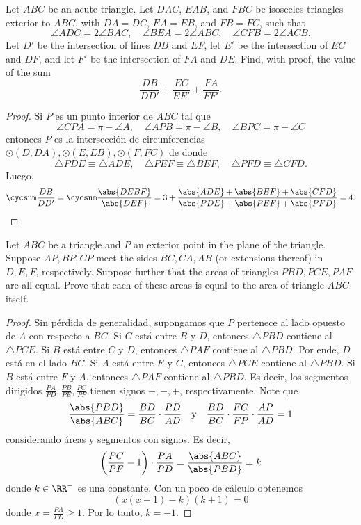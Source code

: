 \begin{probEG}[ISL 2001/G5]
  Let $ABC$ be an acute triangle. Let $DAC$, $EAB$, and $FBC$ be isosceles
  triangles exterior to $ABC$, with $DA=DC$, $EA=EB$, and $FB=FC$, such that
  \[
    \angle ADC=2\angle BAC,\quad
    \angle BEA=2\angle ABC,\quad
    \angle CFB=2\angle ACB.
  \]
  Let $D'$ be the intersection of lines $DB$ and $EF$, let $E'$ be the
  intersection of $EC$ and $DF$, and let $F'$ be the intersection of $FA$ and
  $DE$. Find, with proof, the value of the sum
  \[\frac{DB}{DD'}+\frac{EC}{EE'}+\frac{FA}{FF'}.\]
\end{probEG}

\begin{proof}
  Si $P$ es un punto interior de $ABC$ tal que
  \[
    \angle CPA=\pi-\angle A,\quad
    \angle APB=\pi-\angle B,\quad
    \angle BPC=\pi-\angle C
  \]
  entonces $P$ es la intersección de circunferencias
  $\odot(D,DA),\odot(E,EB),\odot(F,FC)$ de donde
  \[
    \triangle PDE\equiv\triangle ADE,\quad
    \triangle PEF\equiv\triangle BEF,\quad
    \triangle PFD\equiv\triangle CFD.
  \]
  Luego,
  \[
    \cycsum\frac{DB}{DD'}
    =\cycsum\frac{\abs{DEBF}}{\abs{DEF}}
    =3+\frac{\abs{ADE}+\abs{BEF}+\abs{CFD}}{\abs{PDE}+\abs{PEF}+\abs{PFD}}
    =4.
  \]
\end{proof}

\begin{probEG}[ISL 2001/G6]
  Let $ABC$ be a triangle and $P$ an exterior point in the plane of the
  triangle. Suppose $AP,BP,CP$ meet the sides $BC,CA,AB$ (or extensions thereof)
  in $D,E,F$, respectively. Suppose further that the areas of triangles
  $PBD,PCE,PAF$ are all equal. Prove that each of these areas is equal to the
  area of triangle $ABC$ itself.
\end{probEG}

\begin{proof}
  Sin pérdida de generalidad, supongamos que $P$ pertenece al lado opuesto de
  $A$ con respecto a $BC$. Si $C$ está entre $B$ y $D$, entonces $\triangle PBD$
  contiene al $\triangle PCE$. Si $B$ está entre $C$ y $D$, entonces
  $\triangle PAF$ contiene al $\triangle PBD$. Por ende, $D$ está en el lado
  $BC$. Si $A$ está entre $E$ y $C$, entonces $\triangle PCE$ contiene al
  $\triangle PBD$. Si $B$ está entre $F$ y $A$, entonces $\triangle PAF$
  contiene al $\triangle PBD$. Es decir, los segmentos dirigidos
  $\frac{PA}{PD},\frac{PB}{PE},\frac{PC}{PF}$ tienen signos $+,-,+$,
  respectivamente. Note que
  \[
    \frac{\abs{PBD}}{\abs{ABC}}=\frac{BD}{BC}\cdot\frac{PD}{AD}\quad\text{y}\quad
    \frac{BD}{BC}\cdot\frac{FC}{FP}\cdot\frac{AP}{AD}=1
  \]
  considerando áreas y segmentos con signos. Es decir,
  \[
    \left(\frac{PC}{PF}-1\right)\cdot\frac{PA}{PD}
    =\frac{\abs{ABC}}{\abs{PBD}}
    =k
  \]
  donde $k\in\RR^-$ es una constante. Con un poco de cálculo obtenemos
  \[(x(x-1)-k)(k+1)=0\]
  donde $x=\frac{PA}{PD}\ge 1$. Por lo tanto, $k=-1$.
\end{proof}

